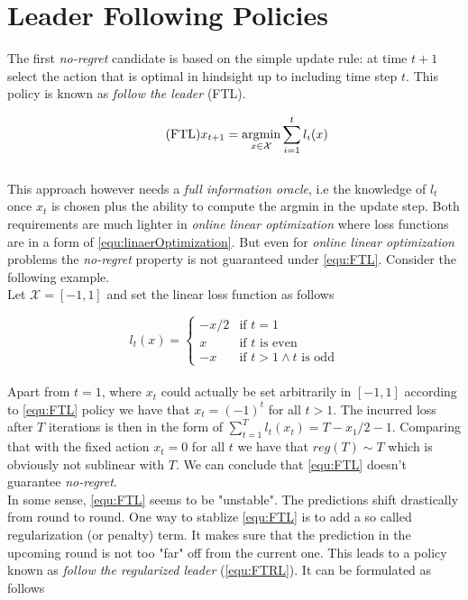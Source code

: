 \section{Leader Following Policies}\label{section:LeaderFollowingPolocies}

The first \textit{no-regret} candidate is based on the simple update rule: at time $t+1$ select the action that is optimal in hindsight up to including time step $t$. This policy is known as \textit{follow the leader} (FTL). 

\begin{equation}
    \tag{FTL}
    x_{t+1} = \operatorname*{\arg\!\min}_{x \in \mathcal{X}} \sum_{i=1}^t l_i(x)
    \label{equ:FTL}
\end{equation} \\

This approach however needs a \textit{full information oracle}, i.e the knowledge of $l_t$ once $x_t$ is chosen plus the ability to compute the argmin in the update step. Both requirements are much lighter in \textit{online linear optimization} where loss functions are in a form of \ref{equ:linaerOptimization}. But even for \textit{online linear optimization} problems the \textit{no-regret} property is not guaranteed under \ref{equ:FTL}. Consider the following example. \\

Let $\mathcal{X} = [-1,1]$ and set the linear loss function as follows

\begin{equation*}
    l_t(x) = \begin{cases}
    -x/2 &\text{if $t = 1$}\\
    x &\text{if $t$ is even}\\
    -x &\text{if $t > 1 \land t$ is odd}
    \end{cases}
\end{equation*} \\

Apart from $t = 1$, where $x_t$ could actually be set arbitrarily in $[-1,1]$ according to \ref{equ:FTL} policy we have that $x_t = (-1)^t$ for all $t > 1$. The incurred loss after $T$ iterations is then in the form of $\sum_{t=1}^T l_t(x_t) = T - x_1/2 -1$. Comparing that with the fixed action $x_t = 0$ for all $t$ we have that $reg(T) \sim T$ which is obviously not sublinear with $T$. We can conclude that \ref{equ:FTL} doesn't guarantee \textit{no-regret}. \\

In some sense, \ref{equ:FTL} seems to be "unstable". The predictions shift drastically from round to round. One way to stablize \ref{equ:FTL} is to add a so called regularization (or penalty) term. It makes sure that the prediction in the upcoming round is not too "far" off from the current one. This leads to a policy known as \textit{follow the regularized leader} (\ref{equ:FTRL}). It can be formulated as follows

